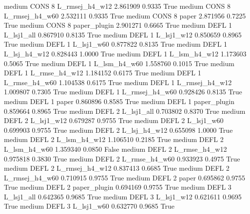     medium     CONS                 8 L_rmsej_h4_w12   2.861909      0.9335    True
    medium     CONS                 8 L_rmsej_h4_w60   2.532111      0.9335    True
    medium     CONS                 8          paper   2.871956      0.7225    True
    medium     CONS                 8   paper_plugin   2.901271      0.6665    True
    medium     DEFL                 1     L_lsj1_all   0.867910      0.8135    True
    medium     DEFL                 1     L_lsj1_w12   0.850659      0.8965    True
    medium     DEFL                 1     L_lsj1_w60   0.877822      0.8135    True
    medium     DEFL                 1   L_lsj_h4_w12   0.828443      1.0000    True
    medium     DEFL                 1   L_lsm_h4_w12   1.173603      0.5065    True
    medium     DEFL                 1   L_lsm_h4_w60   1.558760      0.1015    True
    medium     DEFL                 1  L_rmse_h4_w12   1.184152      0.6175    True
    medium     DEFL                 1  L_rmse_h4_w60   1.104538      0.6175    True
    medium     DEFL                 1 L_rmsej_h4_w12   1.009807      0.7305    True
    medium     DEFL                 1 L_rmsej_h4_w60   0.928426      0.8135    True
    medium     DEFL                 1          paper   0.860896      0.8585    True
    medium     DEFL                 1   paper_plugin   0.859664      0.8965    True
    medium     DEFL                 2     L_lsj1_all   0.703802      0.8370    True
    medium     DEFL                 2     L_lsj1_w12   0.679287      0.9755    True
    medium     DEFL                 2     L_lsj1_w60   0.699903      0.9755    True
    medium     DEFL                 2   L_lsj_h4_w12   0.655098      1.0000    True
    medium     DEFL                 2   L_lsm_h4_w12   1.106510      0.2185    True
    medium     DEFL                 2   L_lsm_h4_w60   1.359340      0.0850   False
    medium     DEFL                 2  L_rmse_h4_w12   0.975818      0.3830    True
    medium     DEFL                 2  L_rmse_h4_w60   0.933923      0.4975    True
    medium     DEFL                 2 L_rmsej_h4_w12   0.837413      0.6685    True
    medium     DEFL                 2 L_rmsej_h4_w60   0.710915      0.9755    True
    medium     DEFL                 2          paper   0.695862      0.9755    True
    medium     DEFL                 2   paper_plugin   0.694169      0.9755    True
    medium     DEFL                 3     L_lsj1_all   0.642365      0.9685    True
    medium     DEFL                 3     L_lsj1_w12   0.621611      0.9695    True
    medium     DEFL                 3     L_lsj1_w60   0.632770      0.9685    True
